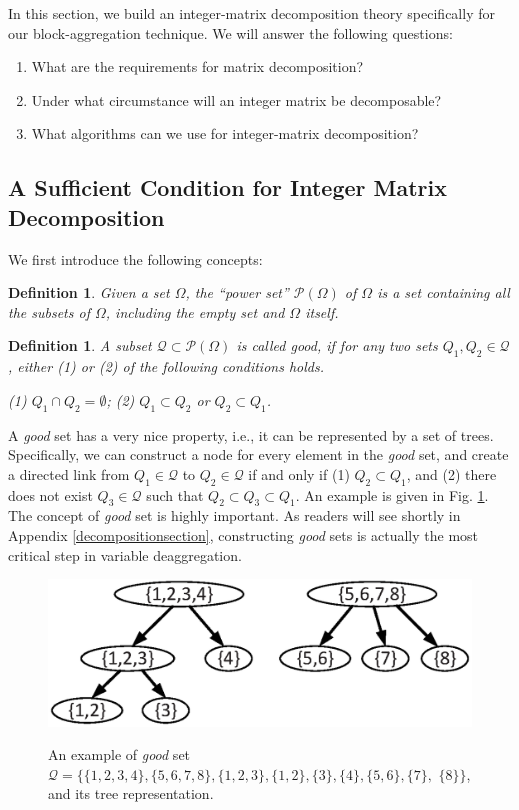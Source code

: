 \documentclass[letterpaper,twocolumn,10pt]{article}
\newtheorem{defn}[thm]{Definition}
\begin{document}
In this section, we build an integer-matrix decomposition theory specifically for our block-aggregation technique. We will answer the following questions: 
\begin{enumerate}
  \item What are the requirements for matrix decomposition? 
  \item Under what circumstance will an integer matrix be decomposable?
  \item What algorithms can we use for integer-matrix decomposition?
\end{enumerate}

\subsection{A Sufficient Condition for Integer Matrix Decomposition}

We first introduce the following concepts:
\begin{defn}\label{powerset}
Given a set $\Omega$, the ``power set'' $\mathcal{P}(\Omega)$ of $\Omega$ is a set containing all the subsets of $\Omega$, including the empty set and $\Omega$ itself.
\end{defn}
\begin{defn}\label{goodset}
A subset $\mathcal{Q}\subset \mathcal{P}(\Omega)$ is called \emph{good}, if for any two sets $Q_1,Q_2\in\mathcal{Q}$, either (1) or (2) of the following conditions holds.

(1) $Q_1\cap Q_2=\emptyset$; (2) $Q_1\subset Q_2$ or $Q_2\subset Q_1$.
\end{defn}

A \emph{good} set has a very nice property, i.e., it can be represented by a set of trees. Specifically, we can construct a node for every element in the \emph{good} set, and create a directed link from $Q_1\in\mathcal{Q}$ to $Q_2\in\mathcal{Q}$ if and only if (1) $Q_2\subset Q_1$, and (2) there does not exist $Q_3\in\mathcal{Q}$ such that $Q_2\subset Q_3\subset Q_1$. An example is given in Fig. \ref{tree}. The concept of \emph{good} set is highly important. As readers will see shortly in Appendix \ref{decompositionsection}, constructing \emph{good} sets is actually the most critical step in variable deaggregation.
\begin{figure}[ht]
  \centering
  \includegraphics[scale=0.6]{tree}\\
  \caption{An example of \emph{good} set $\mathcal{Q}=\{\{1,2,3,4\},\{5,6,7,8\},\{1,2,3\},\{1,2\},\{3\},\{4\},\{5,6\},\{7\},$ $\{8\}\}$, and its tree representation.}\label{tree}
\end{figure}
\end{document}
